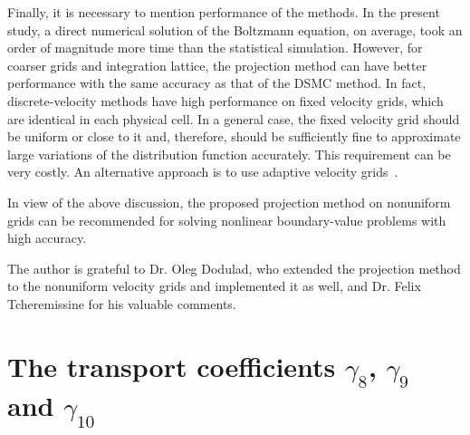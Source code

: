 \documentclass[final]{jfm} %
\begin{document}
Finally, it is necessary to mention performance of the methods.
In the present study, a direct numerical solution of the Boltzmann equation, on average,
took an order of magnitude more time than the statistical simulation.
However, for coarser grids and integration lattice, the projection method can
have better performance with the same accuracy as that of the DSMC method.
In fact, discrete-velocity methods have high performance on fixed velocity grids,
which are identical in each physical cell.
In a general case, the fixed velocity grid should be uniform or close to it and, therefore,
should be sufficiently fine to approximate large variations of the distribution function accurately.
This requirement can be very costly. An alternative approach is to use adaptive velocity grids~\citep{Kolobov2013}.

In view of the above discussion, the proposed projection method on nonuniform grids can be recommended
for solving nonlinear boundary-value problems with high accuracy.

\begin{acknowledgments}
    The author is grateful to Dr. Oleg Dodulad, who extended the projection method
    to the nonuniform velocity grids and implemented it as well,
    and Dr. Felix Tcheremissine for his valuable comments.
\end{acknowledgments}

\appendix
\section{The transport coefficients \(\gamma_8\), \(\gamma_9\) and \(\gamma_{10}\)}
\label{sec:gamma_coeffs}
\end{document}
